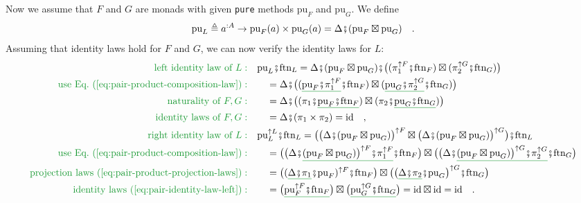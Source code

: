 Now we assume that $F$ and $G$ are monads with given \lstinline!pure!
methods $\text{pu}_{F}$ and $\text{pu}_{G}$. We define
\[
\text{pu}_{L}\triangleq a^{:A}\rightarrow\text{pu}_{F}(a)\times\text{pu}_{G}(a)=\Delta\bef(\text{pu}_{F}\boxtimes\text{pu}_{G})\quad.
\]
Assuming that identity laws hold for $F$ and $G$, we can now verify
the identity laws for $L$:
\begin{align*}
{\color{greenunder}\text{left identity law of }L:}\quad & \text{pu}_{L}\bef\text{ftn}_{L}=\Delta\bef(\text{pu}_{F}\boxtimes\text{pu}_{G})\bef\big((\pi_{1}^{\uparrow F}\bef\text{ftn}_{F})\boxtimes(\pi_{2}^{\uparrow G}\bef\text{ftn}_{G})\big)\\
{\color{greenunder}\text{use Eq.~(\ref{eq:pair-product-composition-law})}:}\quad & \quad=\Delta\bef\big((\gunderline{\text{pu}_{F}\bef\pi_{1}^{\uparrow F}}\bef\text{ftn}_{F})\boxtimes(\gunderline{\text{pu}_{G}\bef\pi_{2}^{\uparrow G}}\bef\text{ftn}_{G})\big)\\
{\color{greenunder}\text{naturality of }F,G:}\quad & \quad=\Delta\bef\big((\pi_{1}\bef\gunderline{\text{pu}_{F}\bef\text{ftn}_{F}})\boxtimes(\pi_{2}\bef\gunderline{\text{pu}_{G}\bef\text{ftn}_{G}})\big)\\
{\color{greenunder}\text{identity laws of }F,G:}\quad & \quad=\Delta\bef(\pi_{1}\times\pi_{2})=\text{id}\quad,\\
{\color{greenunder}\text{right identity law of }L:}\quad & \text{pu}_{L}^{\uparrow L}\bef\text{ftn}_{L}=\big(\big(\Delta\bef(\text{pu}_{F}\boxtimes\text{pu}_{G})\big)^{\uparrow F}\boxtimes\big(\Delta\bef(\text{pu}_{F}\boxtimes\text{pu}_{G})\big)^{\uparrow G}\big)\bef\text{ftn}_{L}\\
{\color{greenunder}\text{use Eq.~(\ref{eq:pair-product-composition-law})}:}\quad & \quad=\big(\big(\Delta\bef\gunderline{(\text{pu}_{F}\boxtimes\text{pu}_{G})\big)^{\uparrow F}\bef\pi_{1}^{\uparrow F}}\bef\text{ftn}_{F}\big)\boxtimes\big(\big(\Delta\bef\gunderline{(\text{pu}_{F}\boxtimes\text{pu}_{G})\big)^{\uparrow G}\bef\pi_{2}^{\uparrow G}}\bef\text{ftn}_{G}\big)\\
{\color{greenunder}\text{projection laws~(\ref{eq:pair-product-projection-laws})}:}\quad & \quad=\big((\gunderline{\Delta\bef\pi_{1}}\bef\text{pu}_{F})^{\uparrow F}\bef\text{ftn}_{F}\big)\boxtimes\big(\big(\gunderline{\Delta\bef\pi_{2}}\bef\text{pu}_{G}\big)^{\uparrow G}\bef\text{ftn}_{G}\big)\\
{\color{greenunder}\text{identity laws~(\ref{eq:pair-identity-law-left})}:}\quad & \quad=\big(\gunderline{\text{pu}_{F}^{\uparrow F}\bef\text{ftn}_{F}}\big)\boxtimes\big(\gunderline{\text{pu}_{G}^{\uparrow G}\bef\text{ftn}_{G}}\big)=\text{id}\boxtimes\text{id}=\text{id}\quad.
\end{align*}

